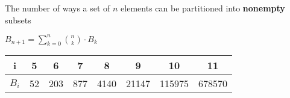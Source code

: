 The number of ways a set of $n$ elements can be partitioned into \textbf{nonempty} subsets

$B_{n+1} = \sum_{k=0}^{n}{{{n}\choose{k}} \cdot B_{k}}$

\begin{tabular}{ |c|c|c|c|c|c|c|c|  }
\hline  
i    & 5  & 6   & 7   & 8    & 9     & 10     & 11          \\
\hline
$B_{i}$ & 52 & 203 & 877 & 4140 & 21147 & 115975 & 678570 \\
\end{tabular}